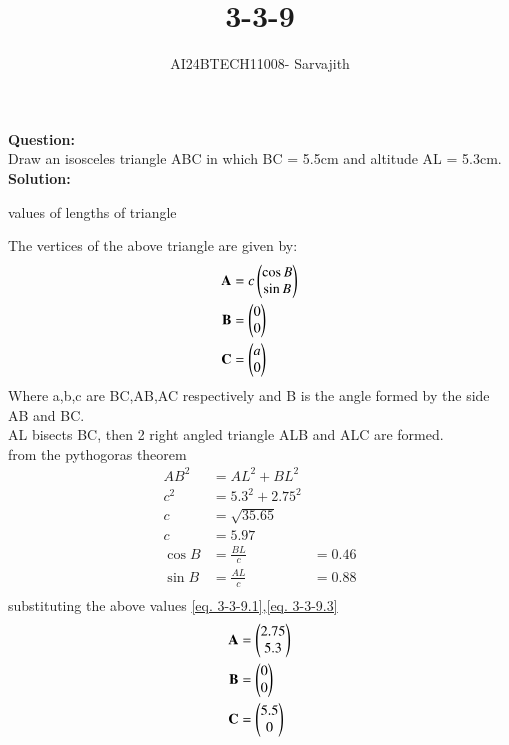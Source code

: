\documentclass[journal]{IEEEtran}
\begin{document}

\vspace{3cm}

\title{3-3-9}
\author{AI24BTECH11008- Sarvajith
}
{\let\newpage\relax\maketitle}

\renewcommand{\thefigure}{\theenumi}
\renewcommand{\thetable}{\theenumi}
\setlength{\intextsep}{10pt} %
\renewcommand{\thetable}{\theenumi}
\textbf{Question: }\\
Draw an isosceles triangle ABC in which BC = 5.5cm and altitude AL = 5.3cm. \\
\textbf{Solution: }\\
\renewcommand{\tablename}{TABLE 1}
\begin{table}[h!]    
\centering
 
\caption{values of lengths of triangle}
 \label{tab1-1.2-18-1}
\end{table}
The vertices of the above triangle are given by:
\begin{align}
    \textbf{A} &= c\begin{pmatrix}\cos B\\\sin B\end{pmatrix} \label{eq. 3-3-9.1}\\
    \textbf{B} &= \begin{pmatrix}0\\0\end{pmatrix}\label{eq. 3-3-9.2}\\
    \textbf{C} &= \begin{pmatrix}a\\0\end{pmatrix}\label{eq. 3-3-9.3}
\end{align}
Where a,b,c are BC,AB,AC respectively and B is the angle formed by the side AB and BC.\\
AL bisects BC, then 2 right angled triangle ALB and ALC are formed.\\
from the pythogoras theorem 
\begin{align*}
    AB^2 &= AL^2 + BL^2\\
    c^2  &= 5.3^2 + 2.75^2\\
    c    &= \sqrt{35.65} \\c &= 5.97\\
    \cos B &= \frac{BL}{c}&= 0.46\\
    \sin B &= \frac{AL}{c}&= 0.88\\
\end{align*}
 substituting the above values \ref{eq. 3-3-9.1},\ref{eq. 3-3-9.3}\\
\begin{align*}
     \textbf{A}&=\begin{pmatrix}2.75\\5.3\end{pmatrix}\\
     \textbf{B}&=\begin{pmatrix}0\\0\end{pmatrix}\\
     \textbf{C}&=\begin{pmatrix}5.5\\0\end{pmatrix}
\end{align*}
\end{document}
